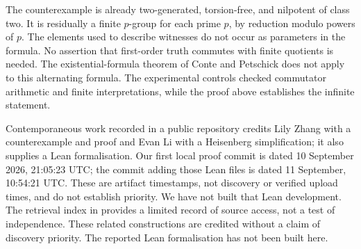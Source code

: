 The counterexample is already two-generated, torsion-free, and
nilpotent of class two. It is residually a finite $p$-group for
each prime $p$, by reduction modulo powers of $p$.
The elements used to describe witnesses do not occur as parameters
in the formula. No assertion that first-order truth commutes with
finite quotients is needed. The existential-formula theorem of
Conte and Petschick does not apply to this alternating formula.
The experimental controls checked commutator arithmetic and finite
interpretations, while the proof above establishes the infinite
statement.

Contemporaneous work recorded in a public repository credits Lily Zhang
with a counterexample and proof and Evan Li with a Heisenberg
simplification; it also supplies a Lean formalisation\cite{zhang-li-concise}.
\iffullpaper
Our first local proof commit is dated 10 September 2026, 21:05:23 UTC;
the commit adding those Lean files is dated 11 September, 10:54:21 UTC.
These are artifact timestamps, not discovery or verified upload times,
and do not establish priority. We have not built that Lean development.
The retrieval index in \reproductionlocation{} provides a limited
record of source access, not a test of independence.
\else
These related constructions are credited without a claim of discovery
priority. The reported Lean formalisation has not been built here.
\fi


